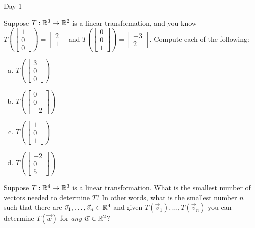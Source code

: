 \documentclass{article}[12pt]
\begin{document}
\begin{applicationActivities}{Day 1}
\begin{activity}
Suppose $T: \mathbb{R}^3 \rightarrow \mathbb{R}^2$ is a linear transformation, and you know $T\left(\begin{bmatrix} 1 \\ 0 \\ 0 \end{bmatrix} \right) = \begin{bmatrix} 2 \\ 1 \end{bmatrix} $ and $T\left(\begin{bmatrix} 0 \\ 0 \\ 1 \end{bmatrix} \right) = \begin{bmatrix} -3 \\ 2 \end{bmatrix} $.  Compute each of the following:
\begin{enumerate}[(a)]
\item $T\left(\begin{bmatrix} 3 \\ 0 \\ 0 \end{bmatrix}\right)$
\item $T\left(\begin{bmatrix} 0 \\ 0 \\ -2 \end{bmatrix}\right)$
\item $T\left(\begin{bmatrix} 1 \\ 0 \\ 1 \end{bmatrix}\right)$
\item $T\left(\begin{bmatrix} -2 \\ 0 \\ 5 \end{bmatrix}\right)$
\end{enumerate}
\end{activity}

\begin{activity}
Suppose $T: \mathbb{R}^4 \rightarrow \mathbb{R}^3$ is a linear transformation.  What is the smallest number of vectors needed to determine $T$?  In other words, what is the smallest number $n$ such that there are $\vec{v}_1,\ldots,\vec{v}_n \in \mathbb{R}^4$ and given  $T(\vec{v}_1), \ldots, T(\vec{v}_n)$ you can determine $T(\vec{w})$ for \textit{any} $\vec{w} \in \mathbb{R}^2$?
\end{activity}


\end{applicationActivities}
\end{document}
